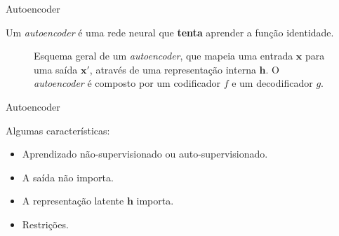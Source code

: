 \documentclass{beamer}
\begin{document}
\begin{frame}{Autoencoder}

	\justifying

	Um \emph{autoencoder} é uma rede neural que \textbf{tenta} aprender a função identidade.

	\begin{figure}

		\centering


		\caption{
			\justifying
			Esquema geral de um \emph{autoencoder}, que mapeia uma entrada $\boldsymbol{x}$ para uma saída $\boldsymbol{x'}$, através de uma representação interna $\boldsymbol{h}$.
			O \emph{autoencoder} é composto por um codificador $f$ e um decodificador $g$.
		}

	\end{figure}

\end{frame}

\begin{frame}{Autoencoder}

	Algumas características:

	\begin{itemize}
		\item Aprendizado não-supervisionado ou auto-supervisionado.
		\item A saída não importa.
		\item A representação latente $\boldsymbol{h}$ importa.
		\item Restrições.
	\end{itemize}

\end{frame}
\end{document}
